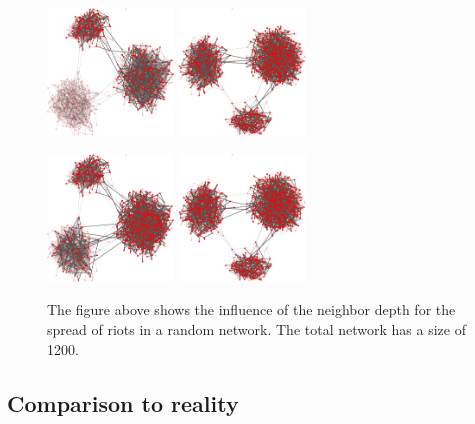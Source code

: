 \begin{figure}
\includegraphics[width=0.3\textwidth]{randomgraphnbrdepth1/network750-crop.pdf}
\hskip2cm
\includegraphics[width=0.3\textwidth]{randomgraphnbrdepth2/network750-crop.pdf}

\includegraphics[width=0.3\textwidth]{randomgraphnbrdepth1/network1000-crop.pdf}
\hskip2cm
\includegraphics[width=0.3\textwidth]{randomgraphnbrdepth2/network1000-crop.pdf}

\caption{The figure above shows the influence of the neighbor depth for the spread of riots in a random network. The total network has a size of 1200.}
\label{influenceNBRdepthRANDOM}
\end{figure}

\subsection{Comparison to reality}
\label{sec:comparisontoreal}
